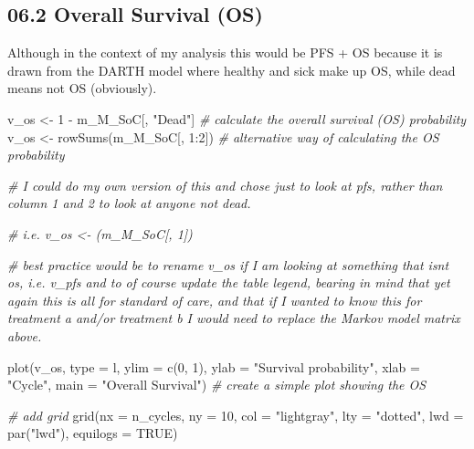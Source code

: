 \documentclass[
]{article}
\newenvironment{Shaded}{\begin{snugshade}}{\end{snugshade}}
\newcommand{\AttributeTok}[1]{\textcolor[rgb]{0.77,0.63,0.00}{#1}}
\newcommand{\CommentTok}[1]{\textcolor[rgb]{0.56,0.35,0.01}{\textit{#1}}}
\newcommand{\ConstantTok}[1]{\textcolor[rgb]{0.00,0.00,0.00}{#1}}
\newcommand{\DecValTok}[1]{\textcolor[rgb]{0.00,0.00,0.81}{#1}}
\newcommand{\FunctionTok}[1]{\textcolor[rgb]{0.00,0.00,0.00}{#1}}
\newcommand{\NormalTok}[1]{#1}
\newcommand{\OtherTok}[1]{\textcolor[rgb]{0.56,0.35,0.01}{#1}}
\newcommand{\SpecialCharTok}[1]{\textcolor[rgb]{0.00,0.00,0.00}{#1}}
\newcommand{\StringTok}[1]{\textcolor[rgb]{0.31,0.60,0.02}{#1}}
\begin{document}
\hypertarget{overall-survival-os}{%
\subsection{06.2 Overall Survival (OS)}\label{overall-survival-os}}

Although in the context of my analysis this would be PFS + OS because it
is drawn from the DARTH model where healthy and sick make up OS, while
dead means not OS (obviously).

\begin{Shaded}
\begin{Highlighting}[]
\NormalTok{v\_os }\OtherTok{\textless{}{-}} \DecValTok{1} \SpecialCharTok{{-}}\NormalTok{ m\_M\_SoC[, }\StringTok{"Dead"}\NormalTok{]    }\CommentTok{\# calculate the overall survival (OS) probability}
\NormalTok{v\_os }\OtherTok{\textless{}{-}} \FunctionTok{rowSums}\NormalTok{(m\_M\_SoC[, }\DecValTok{1}\SpecialCharTok{:}\DecValTok{2}\NormalTok{])  }\CommentTok{\# alternative way of calculating the OS probability}

\CommentTok{\# I could do my own version of this and chose just to look at pfs, rather than column 1 and 2 to look at anyone not dead.}

\CommentTok{\# i.e. v\_os \textless{}{-} (m\_M\_SoC[, 1])}

\CommentTok{\# best practice would be to rename v\_os if I am looking at something that isnt os, i.e. v\_pfs and to of course update the table legend, bearing in mind that yet again this is all for standard of care, and that if I wanted to know this for treatment a and/or treatment b I would need to replace the Markov model matrix above.}


\FunctionTok{plot}\NormalTok{(v\_os, }\AttributeTok{type =} \StringTok{\textquotesingle{}l\textquotesingle{}}\NormalTok{, }
     \AttributeTok{ylim =} \FunctionTok{c}\NormalTok{(}\DecValTok{0}\NormalTok{, }\DecValTok{1}\NormalTok{),}
     \AttributeTok{ylab =} \StringTok{"Survival probability"}\NormalTok{,}
     \AttributeTok{xlab =} \StringTok{"Cycle"}\NormalTok{,}
     \AttributeTok{main =} \StringTok{"Overall Survival"}\NormalTok{)  }\CommentTok{\# create a simple plot showing the OS}

\CommentTok{\# add grid }
\FunctionTok{grid}\NormalTok{(}\AttributeTok{nx =}\NormalTok{ n\_cycles, }\AttributeTok{ny =} \DecValTok{10}\NormalTok{, }\AttributeTok{col =} \StringTok{"lightgray"}\NormalTok{, }\AttributeTok{lty =} \StringTok{"dotted"}\NormalTok{, }\AttributeTok{lwd =} \FunctionTok{par}\NormalTok{(}\StringTok{"lwd"}\NormalTok{), }
     \AttributeTok{equilogs =} \ConstantTok{TRUE}\NormalTok{) }
\end{Highlighting}
\end{Shaded}
\end{document}
